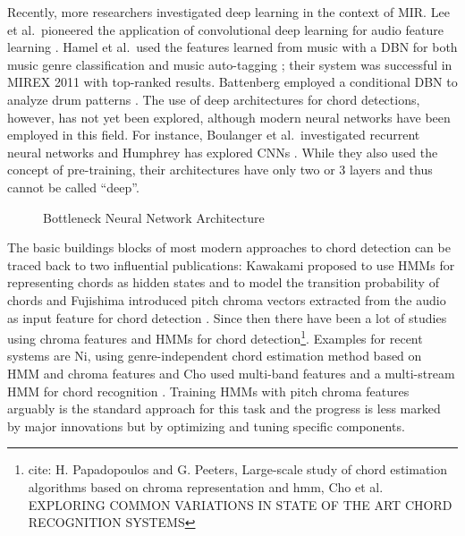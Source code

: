 \documentclass{article}
\begin{document}
Recently, more researchers investigated deep learning in the context of MIR. Lee et al.\ pioneered the application of convolutional deep learning for audio feature learning \cite{lee2009unsupervised}. Hamel et al.\ used the features learned from music with a DBN for both music genre classification and music auto-tagging \cite{hamel2010learning}; their system was successful in MIREX 2011 with top-ranked results. Battenberg employed a conditional DBN to analyze drum patterns \cite{battenberg2012analyzing}. The use of deep architectures for chord detections, however, has not yet been explored, although modern neural networks have been employed in this field. For instance, Boulanger et al.\ investigated recurrent neural networks \cite{boulanger2013audio} and Humphrey has explored CNNs \cite{humphrey2012rethinking,humphrey2012learning}. While they also used the concept of pre-training, their architectures have only two or 3 layers and thus cannot be called ``deep''.
\begin{figure}
 \centerline{}
 \caption{Bottleneck Neural Network Architecture}
 \label{fig:bottleneck}
\end{figure}

The basic buildings blocks of most modern approaches to chord detection can be traced back to two influential publications: Kawakami proposed to use HMMs for representing chords as hidden states and to model the transition probability of chords \cite{kawakami2000hidden} and Fujishima introduced pitch chroma vectors extracted from the audio as input feature for chord detection \cite{fujishima1999realtime}. Since then there have been a lot of studies using chroma features and HMMs for chord detection\footnote{cite: H. Papadopoulos and G. Peeters, Large-scale study of chord estimation algorithms based on chroma representation and hmm, Cho et al. EXPLORING COMMON VARIATIONS IN STATE OF THE ART CHORD RECOGNITION SYSTEMS}. Examples for recent systems are  Ni, using genre-independent chord estimation method based on HMM and chroma features \cite{ni2012using} and Cho used multi-band features and a multi-stream HMM for chord recognition \cite{cho2013mirex}. Training HMMs with pitch chroma features arguably is the standard approach for this task and the progress is less marked by major innovations but by optimizing and tuning specific components. 
\end{document}
